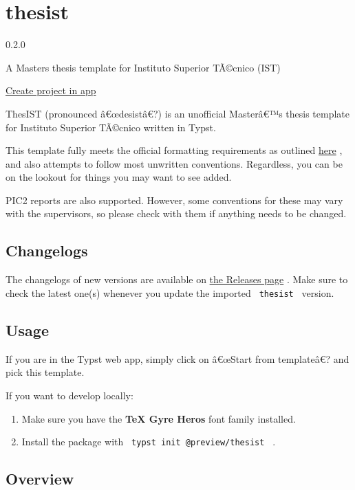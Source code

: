 \section{thesist}\label{thesist}

{ 0.2.0 }

A Master\textquotesingle s thesis template for Instituto Superior
TÃ©cnico (IST)

\href{/app?template=thesist&version=0.2.0}{Create project in app}

\label{readme}
ThesIST (pronounced â€œdesistâ€?) is an unofficial Masterâ€™s thesis
template for Instituto Superior TÃ©cnico written in Typst.

This template fully meets the official formatting requirements as
outlined
\href{https://tecnico.ulisboa.pt/files/2021/09/guia-disserta-o-mestrado.pdf}{here}
, and also attempts to follow most unwritten conventions. Regardless,
you can be on the lookout for things you may want to see added.

PIC2 reports are also supported. However, some conventions for these may
vary with the supervisors, so please check with them if anything needs
to be changed.

\subsection{Changelogs}\label{changelogs}

The changelogs of new versions are available on
\href{https://github.com/tfachada/thesist/releases}{the Releases page} .
Make sure to check the latest one(s) whenever you update the imported
\texttt{\ thesist\ } version.

\subsection{Usage}\label{usage}

If you are in the Typst web app, simply click on â€œStart from
templateâ€? and pick this template.

If you want to develop locally:

\begin{enumerate}
\tightlist
\item
  Make sure you have the \textbf{TeX Gyre Heros} font family installed.
\item
  Install the package with \texttt{\ typst\ init\ @preview/thesist\ } .
\end{enumerate}

\subsection{Overview}\label{overview}

